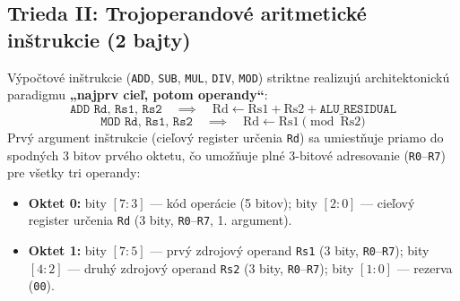 \documentclass[11pt,a4paper]{article}
\newcommand{\reg}[1]{\texttt{#1}}
\newcommand{\bits}[1]{\texttt{#1}}
\begin{document}
\subsection{Trieda II: Trojoperandové aritmetické inštrukcie (2 bajty)}
Výpočtové inštrukcie (\texttt{ADD}, \texttt{SUB}, \texttt{MUL}, \texttt{DIV}, \texttt{MOD}) striktne realizujú architektonickú paradigmu \textbf{„najprv cieľ, potom operandy“}:
$$\texttt{ADD Rd, Rs1, Rs2} \quad \implies \quad \text{Rd} \leftarrow \text{Rs1} + \text{Rs2} + \reg{ALU\_RESIDUAL}$$
$$\texttt{MOD Rd, Rs1, Rs2} \quad \implies \quad \text{Rd} \leftarrow \text{Rs1} \pmod{\text{Rs2}}$$
Prvý argument inštrukcie (cieľový register určenia \reg{Rd}) sa umiestňuje priamo do spodných 3 bitov prvého oktetu, čo umožňuje plné 3-bitové adresovanie (\texttt{R0}--\texttt{R7}) pre všetky tri operandy:
\begin{itemize}
  \item \textbf{Oktet 0:} bity $[7:3]$ --- kód operácie (5 bitov); bity $[2:0]$ --- cieľový register určenia \reg{Rd} (3 bity, \texttt{R0}--\texttt{R7}, 1. argument).
  \item \textbf{Oktet 1:} bity $[7:5]$ --- prvý zdrojový operand \reg{Rs1} (3 bity, \texttt{R0}--\texttt{R7}); bity $[4:2]$ --- druhý zdrojový operand \reg{Rs2} (3 bity, \texttt{R0}--\texttt{R7}); bity $[1:0]$ --- rezerva (\bits{00}).
\end{itemize}
\end{document}
